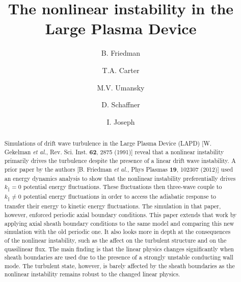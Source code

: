 \documentclass[showpacs,preprintnumbers,amsmath,amssymb,superscriptaddress,aip]{revtex4-1}
\begin{document}
\title{The nonlinear instability in the Large Plasma Device}

\author{B. Friedman}

\author{T.A. Carter}


\author{M.V. Umansky}

\author{D. Schaffner}


\author{I. Joseph}





\begin{abstract}
Simulations of drift wave turbulence in the Large Plasma Device (LAPD) [W. Gekelman \emph{et al.}, Rev. Sci. Inst. {\bf 62}, 2875 (1991)] reveal that a nonlinear instability primarily
drives the turbulence despite the presence of a linear drift wave instability. A prior paper by the authors [B. Friedman \emph{et al.}, Phys Plasmas {\bf 19}, 102307 (2012)] used
an energy dynamics analysis to show that the nonlinear instability preferentially drives $k_\parallel = 0$ potential energy fluctuations. These fluctuations
then three-wave couple to $k_\parallel \ne 0$ potential energy fluctuations in order to access the adiabatic response to transfer their energy to kinetic energy fluctuations.
The simulation in that paper, however, enforced periodic axial boundary conditions. This paper extends that work by applying axial sheath boundary conditions to the same model and comparing
this new simulation with the old periodic one. It also looks more in depth at the consequences of the nonlinear instability, such as the affect on the turbulent structure and on the quasilinear flux.
The main finding is that the linear physics changes significantly when sheath boundaries are used due to the presence of a strongly unstable conducting wall mode. 
The turbulent state, however, is barely affected by the sheath boundaries as the nonlinear instability remains robust to the changed linear physics.
\end{abstract}

\maketitle
\end{document}
